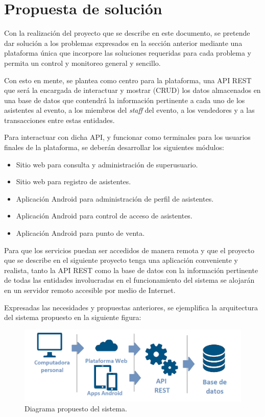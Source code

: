 \section{Propuesta de solución}

Con la realización del proyecto que se describe en este documento, se pretende dar solución a los problemas expresados en la sección anterior mediante una plataforma única que incorpore las soluciones requeridas para cada problema y permita un control y monitoreo general y sencillo.

Con esto en mente, se plantea como centro para la plataforma, una API REST que será la encargada de interactuar y mostrar (CRUD) los datos almacenados en una base de datos que contendrá la información pertinente a cada uno de los asistentes al evento, a los miembros del \textit{staff} del evento, a los vendedores y a las transacciones entre estas entidades.

Para interactuar con dicha API, y funcionar como terminales para los usuarios finales de la plataforma, se deberán desarrollar los siguientes módulos:

\begin{itemize}
  \item Sitio web para consulta y administración de superusuario.

  \item Sitio web para registro de asistentes.

  \item Aplicación Android para administración de perfil de asistentes.

  \item Aplicación Android para control de acceso de asistentes.

  \item Aplicación Android para punto de venta.
\end{itemize}

Para que los servicios puedan ser accedidos de manera remota y que el proyecto que se describe en el siguiente proyecto tenga una aplicación conveniente y realista, tanto la API REST como la base de datos con la información pertinente de todas las entidades involucradas en el funcionamiento del sistema se alojarán en un servidor remoto accesible por medio de Internet.

Expresadas las necesidades y propuestas anteriores, se ejemplifica la arquitectura del sistema propuesto en la siguiente figura:

\begin{figure}[H]
	\centering
	\includegraphics[scale = 0.7]{figures/proposedSystem}
	\caption{Diagrama propuesto del sistema.}
	\label{proposedSystem}
\end{figure}


